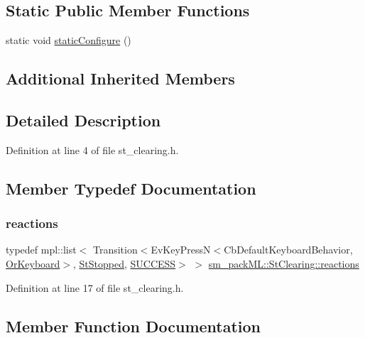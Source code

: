 \subsection*{Static Public Member Functions}
\begin{DoxyCompactItemize}
\item 
static void \hyperlink{structsm__packML_1_1StClearing_acd7cf3e047cae7daba192b77210b5591}{static\+Configure} ()
\end{DoxyCompactItemize}
\subsection*{Additional Inherited Members}


\subsection{Detailed Description}


Definition at line 4 of file st\+\_\+clearing.\+h.



\subsection{Member Typedef Documentation}
\mbox{\label{structsm__packML_1_1StClearing_a94075db172b4e30d02ec9d5d93216ab3}} 
\subsubsection{\texorpdfstring{reactions}{reactions}}
{\footnotesize\ttfamily typedef mpl\+::list$<$ Transition$<$Ev\+Key\+PressN$<$Cb\+Default\+Keyboard\+Behavior, \hyperlink{classsm__packML_1_1OrKeyboard}{Or\+Keyboard}$>$, \hyperlink{structsm__packML_1_1StStopped}{St\+Stopped}, \hyperlink{classSUCCESS}{S\+U\+C\+C\+E\+SS}$>$ $>$ \hyperlink{structsm__packML_1_1StClearing_a94075db172b4e30d02ec9d5d93216ab3}{sm\+\_\+pack\+M\+L\+::\+St\+Clearing\+::reactions}}



Definition at line 17 of file st\+\_\+clearing.\+h.



\subsection{Member Function Documentation}
\mbox{\label{structsm__packML_1_1StClearing_a5482b52bf9c97a5ef422403c27f92f49}} 
